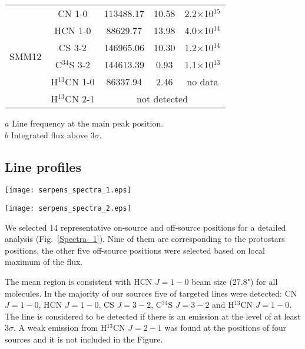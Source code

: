 \documentclass{aa}
\begin{document}
\begin{table}
\begin{tabular}{c c c c c}
\multirow{6}{*}{SMM12} & CN 1-0 & 113488.17 & 10.58 & 2.2$\times$10$^{15}$\\
{} & HCN 1-0 & 88629.77 & 13.98 & 4.0$\times$10$^{14}$\\ 
{} & CS 3-2 & 146965.06 & 10.30 & 1.2$\times$10$^{14}$\\  
{} & C$^{34}$S 3-2 & 144613.39 & 0.93 & 1.1$\times$10$^{13}$\\ 
{} & H$^{13}$CN 1-0 & 86337.94 & 2.46 & no data\\ 
{} & H$^{13}$CN 2-1 & \multicolumn{3}{c}{not detected}  \\  \hline
\end{tabular}
\begin{flushleft}
$a$ Line frequency at the main peak position. \\
$b$ Integrated flux above 3$\sigma$.\\
\end{flushleft}
\end{table}

\subsection{Line profiles}

\begin{figure*}
   \centering
   \texttt{[image: serpens\_spectra\_1.eps]}
         \label{Spectra_1}
   \end{figure*}
\begin{figure*}
   \centering
   \texttt{[image: serpens\_spectra\_2.eps]}
      \caption{Serpens Main sources spectra of C$^{34}$S $J=3-2$, CS $J=3-2$, H$^{13}$CN $J=1-0$, HCN $J=1-0$ and CN $J=1-0$ lines.}
         \label{Spectra_1}
   \end{figure*}

We selected 14 representative on-source and off-source positions for a detailed analysis (Fig.~\ref{Spectra_1}). Nine of them are corresponding to the protostars positions, the other five off-source positions were selected based on local maximum of the flux.   

The mean region is consistent with HCN $J=1-0$ beam size (27.8") for all molecules. In the majority of our sources five of targeted lines were detected: CN $J=1-0$, HCN $J=1-0$, CS $J=3-2$, C$^{34}$S $J=3-2$ and H$^{13}$CN $J=1-0$. The line is considered to be detected if there is an emission at the level of at least 3$\sigma$. A weak emission from H$^{13}$CN $J=2-1$ was found at the positions of four sources and it is not included in the Figure. 
\end{document}

